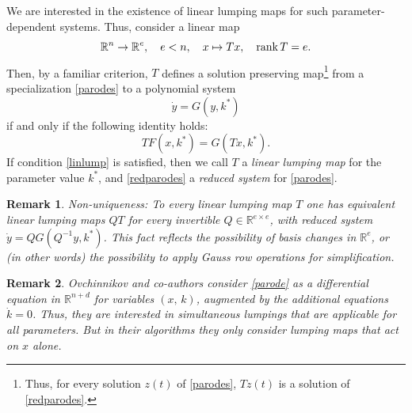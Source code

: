 \documentclass{article}
\newtheorem{remark}{Remark}
\begin{document}
We are interested in the existence of linear lumping maps for such parameter-dependent systems.  Thus, consider  a linear map
\begin{equation}\label{Tdef}
\mathbb R^n\to \mathbb R^e, \quad e<n, \quad x\mapsto Tx, \quad{\rm rank}\,T=e.
\end{equation}
Then, by a familiar criterion, $T$ defines a solution preserving map\footnote{Thus, for every solution $z(t)$  of  \eqref{parodes}, $Tz(t)$ is a solution of \eqref{redparodes}.}  from a specialization \eqref{parodes} to a polynomial system
\begin{equation}\label{redparodes}
\dot y = G(y, k^*)
\end{equation}
if and only if the following identity holds:
\begin{equation}\label{linlump}
TF(x,k^*)=G(Tx,k^*).
\end{equation}
If condition \eqref{linlump} is satisfied, then we call $T$ a {\em linear lumping map} for the parameter value $k^*$, and \eqref{redparodes} a {\em reduced system} for \eqref{parodes}.
\begin{remark}\label{nonuniqrem} {\em Non-uniqueness:
To every linear lumping map $T$ one has equivalent linear lumping maps $QT$ for every invertible $Q\in\mathbb R^{e\times e}$, with reduced system $\dot y=QG(Q^{-1}y,k^*)$. This fact reflects the possibility of basis changes in $\mathbb R^e$, or (in other words) the possibility to apply Gauss row operations for simplification}.  
\end{remark}
\begin{remark}\label{restrem}{\em 
Ovchinnikov and co-authors \cite{OVPT2021} consider \eqref{parode} as a differential equation in $\mathbb R^{n+d}$ for variables $(x,\,k)$, augmented by the additional equations $\dot k=0$. Thus, they are interested in simultaneous lumpings that are applicable for all parameters. But in their algorithms they only consider lumping maps that act on $x$ alone.
}
\end{remark}
\end{document}
